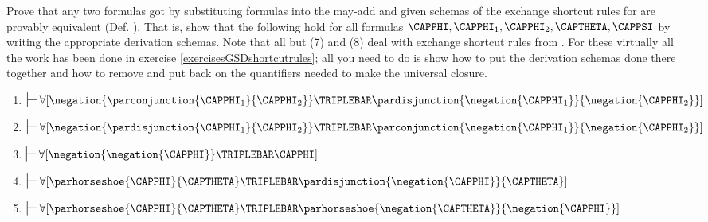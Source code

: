 Prove that any two formulas got by substituting \GQL{} formulas into the may-add and given schemas of the exchange shortcut rules for \GQD{} are provably equivalent (Def. ).
That is, show that the following hold for all \GQL{} formulas $\CAPPHI,\CAPPHI_1,\CAPPHI_2,\CAPTHETA,\CAPPSI$ by writing the appropriate derivation schemas.
Note that all but (7) and (8) deal with exchange shortcut rules from \GSDP{}.
For these virtually all the work has been done in exercise \ref{exercisesGSDshortcutrules}; all you need to do is show how to put the derivation schemas done there together and how to remove and put back on the quantifiers needed to make the universal closure.
\begin{multicols}{2}
\begin{enumerate}
\item $\sststile{}{}\forall[\negation{\parconjunction{\CAPPHI_1}{\CAPPHI_2}}\TRIPLEBAR\pardisjunction{\negation{\CAPPHI_1}}{\negation{\CAPPHI_2}}]$

 
\item $\sststile{}{}\forall[\negation{\pardisjunction{\CAPPHI_1}{\CAPPHI_2}}\TRIPLEBAR\parconjunction{\negation{\CAPPHI_1}}{\negation{\CAPPHI_2}}]$ 
 
 
\item $\sststile{}{}\forall[\negation{\negation{\CAPPHI}}\TRIPLEBAR\CAPPHI]$


\item $\sststile{}{}\forall[\parhorseshoe{\CAPPHI}{\CAPTHETA}\TRIPLEBAR\pardisjunction{\negation{\CAPPHI}}{\CAPTHETA}]$ 

 
\item $\sststile{}{}\forall[\parhorseshoe{\CAPPHI}{\CAPTHETA}\TRIPLEBAR\parhorseshoe{\negation{\CAPTHETA}}{\negation{\CAPPHI}}]$ 


\end{enumerate}
\end{multicols}
